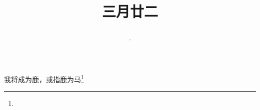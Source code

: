 \title{\date[d=30,m=4,y=2024][year:cn-y,年,month:cn,day:cn,日,·,weekday]·三月廿二 }
我将成为鹿，或指鹿为马\footnote{ }

